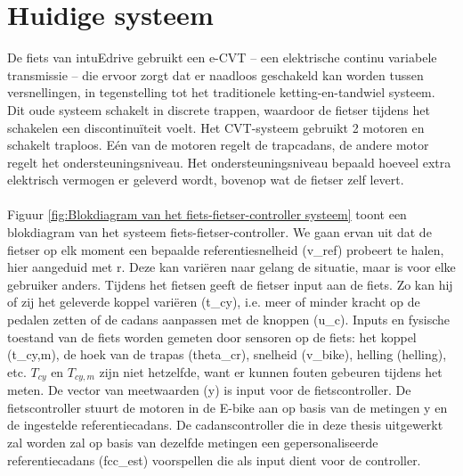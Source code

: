 \section{Huidige systeem}
De fiets van intuEdrive gebruikt een e-CVT – een elektrische continu variabele transmissie – die ervoor zorgt dat er naadloos geschakeld kan worden tussen versnellingen, in tegenstelling tot het traditionele ketting-en-tandwiel systeem. Dit oude systeem schakelt in discrete trappen, waardoor de fietser tijdens het schakelen een discontinuïteit voelt. Het CVT-systeem gebruikt 2 motoren en schakelt traploos. Eén van de motoren regelt de trapcadans, de andere motor regelt het ondersteuningsniveau. Het ondersteuningsniveau bepaald hoeveel extra elektrisch vermogen er geleverd wordt, bovenop wat de fietser zelf levert.
\\\\
Figuur \ref{fig:Blokdiagram van het fiets-fietser-controller systeem} toont een blokdiagram van het systeem fiets-fietser-controller. We gaan ervan uit dat de fietser op elk moment een bepaalde referentiesnelheid (\gls{v_ref}) probeert te halen, hier aangeduid met r. Deze kan variëren naar gelang de situatie, maar is voor elke gebruiker anders. Tijdens het fietsen geeft de fietser input aan de fiets. Zo kan hij of zij het geleverde koppel variëren (\gls{t_cy}), i.e. meer of minder kracht op de pedalen zetten of de cadans aanpassen met de knoppen (\gls{u_c}). Inputs en fysische toestand van de fiets worden gemeten door sensoren op de fiets: het koppel (\gls{t_cy,m}), de hoek van de trapas (\gls{theta_cr}), snelheid (\gls{v_bike}), helling (\gls{helling}), etc. $T_{cy}$ en $T_{cy,m}$ zijn niet hetzelfde, want er kunnen fouten gebeuren tijdens het meten. De vector van meetwaarden (\gls{y}) is input voor de fietscontroller. De fietscontroller stuurt de motoren in de E-bike aan op basis van de metingen \gls{y} en de ingestelde referentiecadans. De cadanscontroller die in deze thesis uitgewerkt zal worden zal op basis van dezelfde metingen een gepersonaliseerde referentiecadans (\gls{fcc_est}) voorspellen die als input dient voor de controller.

